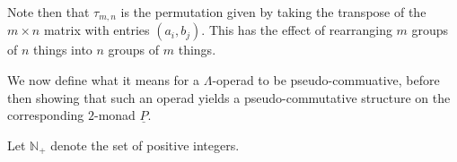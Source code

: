 Note then that $\tau_{m,n}$ is the permutation given by taking the transpose of the $m \times n$ matrix with entries $(a_{i}, b_{j})$. This has the effect of rearranging $m$ groups of $n$ things into $n$ groups of $m$ things.

We now define what it means for a $\Lambda$-operad to be pseudo-commuative, before then showing that such an operad yields a pseudo-commutative structure on the corresponding $2$-monad $\underline{P}$. 

\begin{nota}
Let $\mathbb{N}_{+}$ denote the set of positive integers.
\end{nota}

